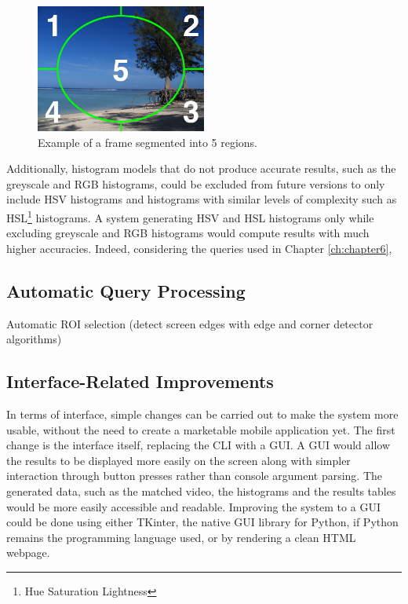\begin{figure}[h] 
\centerline{\includegraphics[width=0.5\textwidth]{figures/conclusions/image_regions.jpg}}
\caption{\label{fig:conclusions-image_regions}Example of a frame segmented into 5 regions.}
\end{figure}

Additionally, histogram models that do not produce accurate results, such as the greyscale and RGB histograms, could be excluded from future versions to only include HSV histograms and histograms with similar levels of complexity such as HSL\footnote{Hue Saturation Lightness} histograms. A system generating HSV and HSL histograms only while excluding greyscale and RGB histograms would compute results with much higher accuracies. Indeed, considering the queries used in Chapter \ref{ch:chapter6}, 

\subsection{Automatic Query Processing}

Automatic ROI selection (detect screen edges with edge and corner detector algorithms)

\subsection{Interface-Related Improvements}

In terms of interface, simple changes can be carried out to make the system more usable, without the need to create a marketable mobile application yet. The first change is the interface itself, replacing the CLI with a GUI. A GUI would allow the results to be displayed more easily on the screen along with simpler interaction through button presses rather than console argument parsing. The generated data, such as the matched video, the histograms and the results tables would be more easily accessible and readable. Improving the system to a GUI could be done using either TKinter, the native GUI library for Python, if Python remains the programming language used, or by rendering a clean HTML webpage.

